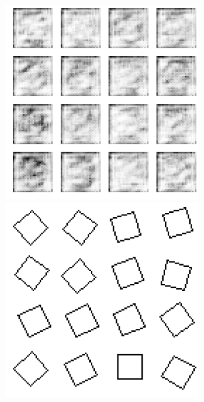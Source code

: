 \documentclass{article}
\begin{document}
\clearpage
\begin{figure}[ht]
\label{fig:gan-samples-simpleshape}
\centering
\includegraphics[height=330px]{gan-sample-fake-simpleshape.png}
\caption{}
\includegraphics[height=330px]{gan-sample-real-simpleshape.png}
\end{figure}
\end{document}
